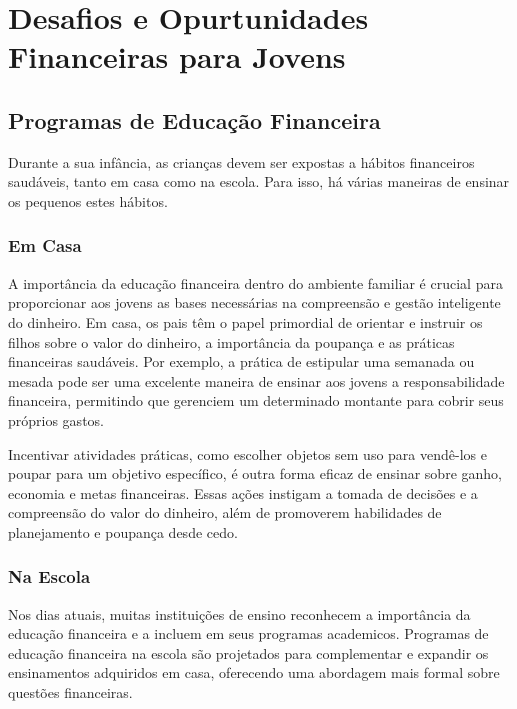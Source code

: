 \documentclass{report}
\begin{document}
\section{Desafios e Opurtunidades Financeiras para Jovens}
\label{sec:Desafios e Opurtunidades Financeiras para Jovens}

\subsection{Programas de Educação Financeira}
\label{subsec:Programas de Educação Financeira}

Durante a sua infância, as crianças devem ser expostas a hábitos financeiros saudáveis, tanto em casa como na escola. 
Para isso, há várias maneiras de ensinar os pequenos estes hábitos. 

\subsubsection{Em Casa}
\label{Em Casa}

A importância da educação financeira dentro do ambiente familiar é crucial para proporcionar aos jovens as bases necessárias na compreensão e gestão inteligente do dinheiro. Em casa, os pais têm o papel primordial de orientar e instruir os filhos sobre o valor do dinheiro, a importância da poupança e as práticas financeiras saudáveis. Por exemplo, a prática de estipular uma semanada ou mesada pode ser uma excelente maneira de ensinar aos jovens a responsabilidade financeira, permitindo que gerenciem um determinado montante para cobrir seus próprios gastos.

Incentivar atividades práticas, como escolher objetos sem uso para vendê-los e poupar para um objetivo específico, é outra forma eficaz de ensinar sobre ganho, economia e metas financeiras. Essas ações instigam a tomada de decisões e a compreensão do valor do dinheiro, além de promoverem habilidades de planejamento e poupança desde cedo.

\subsubsection{Na Escola}
\label{Na Escola}

Nos dias atuais, muitas instituições de ensino reconhecem a importância da educação financeira e a incluem em seus programas academicos. Programas de educação financeira na escola são projetados para complementar e expandir os ensinamentos adquiridos em casa, oferecendo uma abordagem mais formal sobre questões financeiras.
\end{document}
